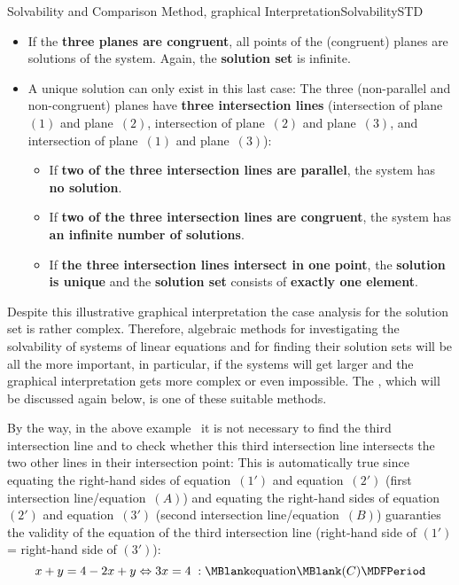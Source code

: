 \begin{MXContent}{Solvability and Comparison Method, graphical Interpretation}{Solvability}{STD}
\begin{itemize}
{the third (non-parallel) plane is an \textbf{intersection line}. All points on this intersection
line are solutions of the system. Hence, the \textbf{solution set} is infinite.}
\item{If the \textbf{three planes are congruent}, all points of the (congruent) planes are 
solutions of the system. Again, the \textbf{solution set} is infinite.}
\item{A unique solution can only exist in this last case: The three (non-parallel and non-congruent)
planes have \textbf{three intersection lines} (intersection of plane~$(1)$ and plane~$(2)$, 
intersection of plane~$(2)$ and plane~$(3)$, and intersection of plane~$(1)$ and plane~$(3)$):
\begin{itemize}
\item{If \textbf{two of the three intersection lines are parallel}, the system has \textbf{no solution}.}
\item{If \textbf{two of the three intersection lines are congruent}, the system has 
\textbf{an infinite number of solutions}.}
\item{If \textbf{the three intersection lines intersect in one point}, the \textbf{solution is unique}
and the \textbf{solution set} consists of \textbf{exactly one element}.}
\end{itemize}}
\end{itemize}
Despite this illustrative graphical interpretation the case analysis for the solution set is 
rather complex. Therefore, algebraic methods for investigating the solvability 
of systems of linear equations and for finding their solution sets will be all the more important, 
in particular, if the systems will get larger
and the graphical interpretation gets more complex or even impossible.
The , which will be discussed again below,
is one of these suitable methods.

By the way, in the above example~ it is not necessary to 
find the third intersection line and to check whether this third intersection line intersects
the two other lines in their intersection point: This is automatically true since 
equating the right-hand sides of equation~$(1')$ and equation~$(2')$  (first intersection
line/equation~$(A)$) and equating the right-hand sides of equation~$(2')$ and equation~$(3')$ 
(second intersection line/equation~$(B)$) guaranties the validity of the equation of 
the third intersection line (right-hand side of $(1')$ = right-hand side of $(3')$):
$$x + y = 4 - 2 x + y \Leftrightarrow 3 x = 4 \; : \MBlank\mbox{equation}\MBlank (C) \MDFPeriod $$


\end{MXContent}
